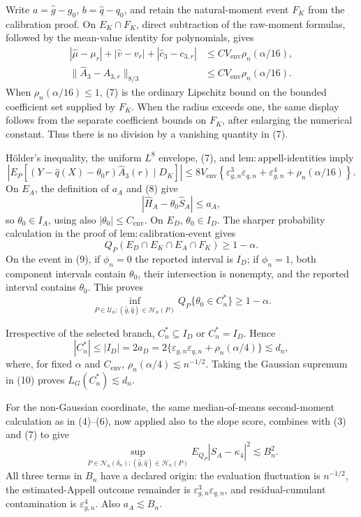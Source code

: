 Write \(a=\widehat g-g_0\), \(b=\widehat q-q_0\), and retain the natural-moment event \(F_K\) from the calibration proof.  On \(E_K\cap F_K\), direct subtraction of the raw-moment formulas, followed by the mean-value identity for polynomials, gives
\[
\begin{aligned}
|\widehat\mu-\mu_r|+|\widehat v-v_r|+|\widehat c_3-c_{3,r}|
&\le C V_{\mathrm{env}}\rho_n(\alpha/16),\\
\lVert\widehat A_3-A_{3,r}\rVert_{8/3}
&\le C V_{\mathrm{env}}\rho_n(\alpha/16).
\end{aligned}
\tag{7}
\]
When \(\rho_n(\alpha/16)\le1\), (7) is the ordinary Lipschitz bound on the bounded coefficient set supplied by \(F_K\).  When the radius exceeds one, the same display follows from the separate coefficient bounds on \(F_K\), after enlarging the numerical constant.  Thus there is no division by a vanishing quantity in (7).

H\"older's inequality, the uniform \(L^8\) envelope, (7), and \(\mathrm{lem:appell\mbox{-}identities}\) imply
\[
\left|E_P[(Y-\widehat q(X)-\theta_0r)\widehat A_3(r)\mid D_K]\right|
\le8V_{\mathrm{env}}\left\{
\varepsilon_{g,n}^3\varepsilon_{q,n}+\varepsilon_{g,n}^4
+\rho_n(\alpha/16)\right\}.
\tag{8}
\]
On \(E_A\), the definition of \(a_A\) and (8) give
\[
|\widehat H_A-\theta_0\widehat S_A|\le a_A,
\]
so \(\theta_0\in I_A\), using also \(|\theta_0|\le C_{\mathrm{env}}\).  On \(E_D\), \(\theta_0\in I_D\).  The sharper probability calculation in the proof of \(\mathrm{lem:calibration\mbox{-}event}\) gives
\[
Q_P(E_D\cap E_K\cap E_A\cap F_K)\ge1-\alpha.
\tag{9}
\]
On the event in (9), if \(\phi_n=0\) the reported interval is \(I_D\); if \(\phi_n=1\), both component intervals contain \(\theta_0\), their intersection is nonempty, and the reported interval contains \(\theta_0\).  This proves
\[
\inf_{P\in\mathcal U_n:(\widehat g,\widehat q)\in\mathcal H_n(P)}
Q_P\{\theta_0\in C_n^*\}\ge1-\alpha.
\]

Irrespective of the selected branch, \(C_n^*\subseteq I_D\) or \(C_n^*=I_D\).  Hence
\[
|C_n^*|\le|I_D|=2a_D
=2\{\varepsilon_{g,n}\varepsilon_{q,n}+\rho_n(\alpha/4)\}
\lesssim d_n,
\tag{10}
\]
where, for fixed \(\alpha\) and \(C_{\mathrm{env}}\), \(\rho_n(\alpha/4)\lesssim n^{-1/2}\).  Taking the Gaussian supremum in (10) proves \(L_G(C_n^*)\lesssim d_n\).

For the non-Gaussian coordinate, the same median-of-means second-moment calculation as in (4)--(6), now applied also to the slope score, combines with (3) and (7) to give
\[
\sup_{P\in\mathcal N_n(\delta_n):(\widehat g,\widehat q)\in\mathcal H_n(P)}
E_{Q_P}|\widehat S_A-\kappa_4|^2\lesssim B_n^2.
\tag{11}
\]
All three terms in \(B_n\) have a declared origin: the evaluation fluctuation is \(n^{-1/2}\), the estimated-Appell outcome remainder is \(\varepsilon_{g,n}^3\varepsilon_{q,n}\), and residual-cumulant contamination is \(\varepsilon_{g,n}^4\).  Also \(a_A\lesssim B_n\).

